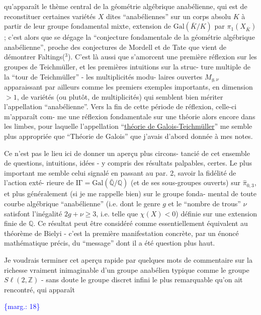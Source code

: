 \documentclass[11pt]{article}
\newcommand{\scanpage}[1]{\par\bigskip\noindent{\small\sffamily[scan #1]}\par}
\newcommand{\mspage}[1]{{\small\sffamily[p.\,#1]}}
\newcommand{\margin}[1]{\textcolor{blue}{\{\textsf{marg.:} #1\}}}
\newcommand{\uline}[1]{\underline{#1}}
\begin{document}
qu'apparaît le thème central de la géométrie algébrique anabélienne,
qui est de reconstituer certaines variétés $X$ dites ``anabéliennes''
sur un corps absolu $K$ à partir de leur groupe fondamental mixte,
extension de $\mathrm{Gal}(\bar{K}/K)$ par $\pi_1(X_{\bar{K}})$ ; c'est alors que se dégage la
``conjecture fondamentale de la géométrie algébrique anabélienne'',
proche des conjectures de Mordell et de Tate que vient de démontrer
Faltings($^3$). C'est là aussi que s'amorcent une première réflexion sur
les groupes de Teichmüller, et les premières intuitions sur la struc-%
ture multiple de la ``tour de Teichmüller'' - les multiplicités modu-%
laires ouvertes $M_{g,\nu}$ apparaissant par ailleurs comme les premiers
exemples importants, en dimension $> 1$, de variétés (ou plutôt, de
multiplicités) qui semblent bien mériter l'appellation ``anabélienne''.
Vers la fin de cette période de réflexion, celle-ci m'apparaît com-%
me une réflexion fondamentale sur une théorie alors encore dans les
limbes, pour laquelle l'appellation ``\uline{théorie de Galois-Teichmüller}''
me semble plus appropriée que ``Théorie de Galois'' que j'avais d'abord
donnée à mes notes.

Ce n'est pas le lieu ici de donner un aperçu plus circons-%
tancié de cet ensemble de questions, intuitions, idées - y compris
des résultats palpables, certes. Le plus important me semble celui
signalé en passant au par. 2, savoir la fidélité de l'action exté-%
rieure de $\mathrm{I\Gamma} = \mathrm{Gal}(\bar{\mathbb{Q}}/\mathbb{Q})$ (et de ses sous-groupes ouverts) sur $\hat{\pi}_{0,3}$,
et plus généralement (si je me rappelle bien) sur le groupe fonda-%
mental de toute courbe algébrique ``anabélienne'' (i.e. dont le genre
$g$ et le ``nombre de trous'' $\nu$ satisfont l'inégalité $2g + \nu \geq 3$,
i.e. telle que $\chi(X) < 0$) définie sur une extension finie de $\mathbb{Q}$. Ce
résultat peut être considéré comme essentiellement équivalent au
théorème de Bielyi - c'est la première manifestation concrète, par
un énoncé mathématique précis, du ``message'' dont il a été question
plus haut.

Je voudrais terminer cet aperçu rapide par quelques mots
de commentaire sur la richesse vraiment inimaginable d'un groupe
anabélien typique comme le groupe $S\ell(2,\mathbb{Z})$ - sans doute le groupe
discret infini le plus remarquable qu'on ait rencontré, qui apparaît

\margin{18}

\clearpage
\scanpage{119/19}
\mspage{17}
\end{document}
